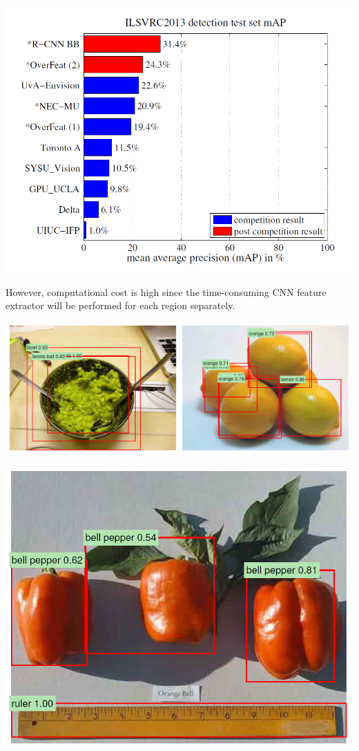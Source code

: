 \begin{frame}[allowframebreaks]
\framebreak 

\begin{center}
	\includegraphics[scale=0.6]{figs/mAP_RCNN}
\end{center}
However, computational cost is high since the time-consuming CNN feature extractor will be performed for each region separately.


\framebreak



\begin{center}
	\includegraphics[scale=0.5]{figs/RCNN_bad_classification}
\end{center}

\begin{center}
	\includegraphics[scale=0.6]{figs/RCNN_right_classification}
\end{center}


\end{frame}

